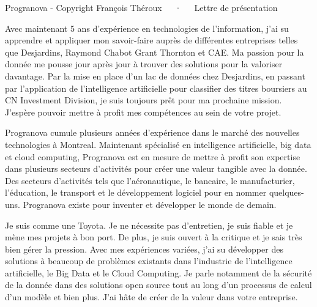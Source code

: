 \documentclass[11pt, a4paper]{awesome-cv}
\begin{document}
\makecvheader[R]

\makecvfooter
  {Progranova - Copyright }
  {François Théroux~~~·~~~Lettre de présentation}
  {}

\makelettertitle

\begin{cvletter}

Avec maintenant 5 ans d'expérience en technologies de l'information, j'ai su apprendre et appliquer mon savoir-faire auprès de différentes entreprises telles que Desjardins, Raymond Chabot Grant Thornton et CAE. Ma passion pour la donnée me pousse jour après jour à trouver des solutions pour la valoriser davantage.  Par la mise en place d'un lac de données chez Desjardins, en passant par l'application de l'intelligence artificielle pour classifier des titres boursiers au CN Investment Division, je suis toujours prêt pour ma prochaine mission. J'espère pouvoir mettre à profit mes compétences au sein de votre projet.

Progranova cumule plusieurs années d'expérience dans le marché des nouvelles technologies à Montreal. Maintenant spécialisé en intelligence artificielle, big data et cloud computing, Progranova est en mesure de mettre à profit son expertise dans plusieurs secteurs d'activités pour créer une valeur tangible avec la donnée. Des secteurs d'activités tels que l'aéronautique, le bancaire, le manufacturier, l'éducation, le transport et le développement logiciel pour en nommer quelques-uns. Progranova existe pour inventer et développer le monde de demain.

Je suis comme une Toyota. Je ne nécessite pas d'entretien, je suis fiable et je mène mes projets à bon port. De plus, je suis ouvert à la critique et je sais très bien gérer la pression. Avec mes expériences variées, j'ai su développer des solutions à beaucoup de problèmes existants dans l'industrie de l'intelligence artificielle, le Big Data et le Cloud Computing. Je parle notamment de la sécurité de la donnée dans des solutions open source tout au long d'un processus de calcul d'un modèle et bien plus.
\newline
\newline
J'ai hâte de créer de la valeur dans votre entreprise.


\end{cvletter}


\makeletterclosing
\end{document}

